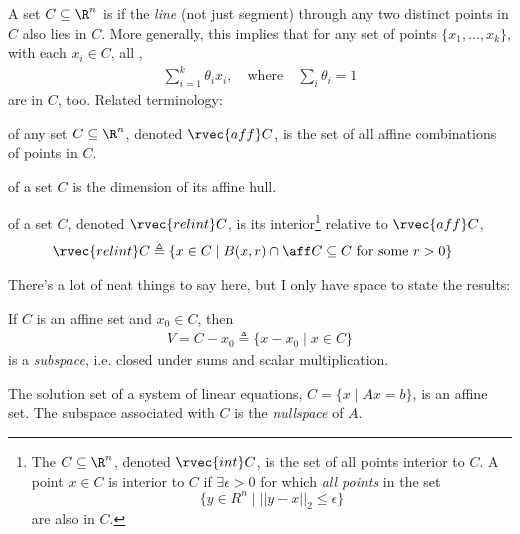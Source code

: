 \documentclass[11pt]{article}
\begin{document}
\begin{definition}
	A set $C \subseteq \R^n$ is  if the \textit{line} (not just segment) through any two distinct points in $C$ also lies in $C$. More generally, this implies that for any set of points $\{x_1, \ldots, x_k\}$, with each $x_i \in C$, all ,
	\begin{align}
		\sum_{i=1}^{k} \theta_i x_i, \quad\text{where}\quad \sum_i \theta_i = 1
	\end{align}
	are in $C$, too. Related terminology:
	\begin{compactitem}
		\item {} of any set $C \subseteq \R^n$, denoted $\rvec{aff}C$, is the set of all affine combinations of points in $C$. 
		
		\item {} of a set $C$ is the dimension of its affine hull. 
		
		\item {} of a set $C$, denoted $\rvec{relint}C$, is its interior\footnote{
			The  $C \subseteq \R^n$, denoted $\rvec{int}C$, is the set of all points interior to $C$. A point $x \in C$ is interior to $C$ if $\exists \epsilon > 0$ for which \textit{all points} in the set
			$$
			\{ y \in R^n \mid ||y - x||_2 \le \epsilon  \}
			$$
			are also in $C$.
		}
		relative to $\rvec{aff}C$,
		\begin{align}
			\rvec{relint}C
				&\triangleq \{  x \in C \mid B(x, r) \cap \aff C \subseteq C  ~\text{for some}~ r > 0  \}
		\end{align}
	\end{compactitem}
\end{definition}
There's a lot of neat things to say here, but I only have space to state the results:
\begin{compactitem}
	\item If $C$ is an affine set and $x_0 \in C$, then
	\begin{align}
		V = C - x_0 \triangleq \{ x - x_0 \mid x \in C  \}
	\end{align}
	is a \textit{subspace}, i.e. closed under sums and scalar multiplication. 
	
	\item The solution set of a system of linear equations, $C = \{ x \mid Ax=b  \}$, is an affine set. The subspace associated with $C$ is the \textit{nullspace} of $A$. 
\end{compactitem}
\end{document}
